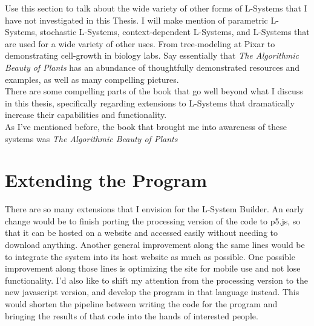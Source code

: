 \documentclass[12pt,twoside]{reedthesis}
\begin{document}
Use this section to talk about the wide variety of other forms of L-Systems that I have not investigated in this Thesis. I will make mention of parametric L-Systems, stochastic L-Systems, context-dependent L-Systems, and L-Systems that are used for a wide variety of other uses. From tree-modeling at Pixar to demonstrating cell-growth in biology labs.
Say essentially that \textit{The Algorithmic Beauty of Plants} has an abundance of thoughtfully demonstrated resources and examples, as well as many compelling pictures.\\

 There are some compelling parts of the book that go well beyond what I discuss in this thesis, specifically regarding extensions to L-Systems that dramatically increase their capabilities and functionality.\\

	
	
	
	As I've mentioned before, the book that brought me into awareness of these systems was \textit{The Algorithmic Beauty of Plants}

\section{Extending the Program}

	There are so many extensions that I envision for the L-System Builder. An early change would be to finish porting the processing version of the code to p5.js, so that it can be hosted on a website and accessed easily without needing to download anything. Another general improvement along the same lines would be to integrate the system into its host website as much as possible. One possible improvement along those lines is optimizing the site for mobile use and not lose functionality. I'd also like to shift my attention from the processing version to the new javascript version, and develop the program in that language instead. This would shorten the pipeline between writing the code for the program and bringing the results of that code into the hands of interested people.\\
	
\end{document}
